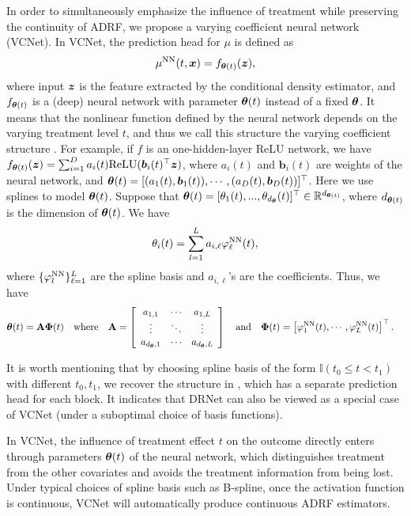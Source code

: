 In order to simultaneously emphasize the influence of treatment while preserving the continuity of ADRF, we propose a varying coefficient neural network (VCNet). In VCNet, the prediction head for $\mu$ is defined as
\[
\mu^{\text{NN}}(t,\boldsymbol{x})=f_{\boldsymbol{\theta}(t)}(\boldsymbol{z}),
\]
where input $\boldsymbol{z}$ is the feature extracted by the conditional density estimator,  and $f_{\boldsymbol{\theta}(t)}$ is a (deep) neural network with parameter $\boldsymbol{\theta}(t)$ instead of a fixed $\boldsymbol{\theta}$. It means that the nonlinear function defined by the neural network depends on the varying treatment level $t$, and thus we call this structure the varying coefficient structure \citep{hastie1993varying, fan1999statistical, chiang2001smoothing}. For example, if $f$ is an one-hidden-layer ReLU network, we have $f_{\boldsymbol{\theta}(t)}(\boldsymbol{z}) = \sum_{i=1}^Da_{i}(t)\text{ReLU}(\boldsymbol{b}_i(t)^{\top}\boldsymbol{z})$, where $a_{i}(t)$ and $\boldsymbol{b}_i(t)$ are weights of the neural network, and $\boldsymbol{\theta}(t)=[(a_1(t),\boldsymbol{b}_1(t)),\cdots,(a_D(t),\boldsymbol{b}_D(t))]^\top$. Here we use splines to model $\boldsymbol{\theta}(t)$. Suppose that $\boldsymbol{\theta}(t)=[\theta_{1}(t),...,\theta_{d_{\boldsymbol{\theta}}}(t)]^\top\in\mathbb{R}^{d_{\boldsymbol{\theta}(t)}}$,
where $d_{\boldsymbol{\theta}(t)}$ is the dimension of $\boldsymbol{\theta}(t)$. We have 
\[
\theta_{i}(t)=\sum_{l=1}^{L}a_{i,\ell}\varphi^{\text{NN}}_{\ell}(t),
\]
where $\{\varphi^{\text{NN}}_{l}\}_{\ell=1}^{L}$ are the spline basis and $a_{i,\ell}$'s are the coefficients. Thus, we
have 
\begin{align*}
\boldsymbol{\theta}(t) & =\textbf{A}\boldsymbol{\Phi}(t)\quad\text{where}\quad
\textbf{A}  =\left[\begin{array}{ccc}
a_{1,1} & \cdots & a_{1,L}\\
\vdots & \ddots & \vdots\\
a_{d_{\boldsymbol{\theta}},1} & \cdots & a_{d_{\boldsymbol{\theta}},L}
\end{array}\right]\quad\text{and}\quad
\boldsymbol{\Phi}(t) =\left[\varphi^{\text{NN}}_{1}(t),\cdots, \varphi^{\text{NN}}_{L}(t)\right]^\top.
\end{align*}

It is worth mentioning that by choosing spline basis of the form $\mathbb{I}(t_0\le t< t_1)$ with different $t_0,t_1$, we recover the structure in \cite{schwab2019learning}, which has a separate prediction head for each block. It indicates that DRNet can also be viewed as a special case of VCNet (under a suboptimal choice of basis functions). 

In VCNet, the influence of treatment effect $t$ on the outcome directly enters through parameters $\boldsymbol{\theta}(t)$ of the neural network, which distinguishes treatment from the other covariates and avoids the treatment information from being lost. Under typical choices of spline basis such as B-spline, once the activation function is continuous, VCNet will automatically produce continuous ADRF estimators.


